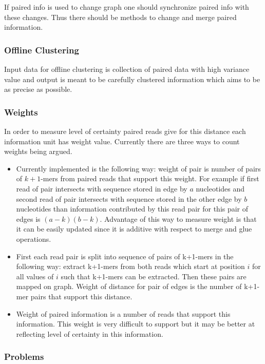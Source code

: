 \documentclass[12pt]{article}
\begin{document}
If paired info is used to change graph one should synchronize paired info with these changes. Thus there should be methods to change and merge paired information.

\subsubsection{Offline Clustering}

Input data for offline clustering is collection of paired data with high variance value and output is meant to be carefully clustered information which aims to be as precise as possible.

\subsubsection{Weights}
In order to measure level of certainty paired reads give for this distance each information unit has weight value. Currently there are three ways to count weights being argued.

\begin{itemize}
\item Currently implemented is the following way: weight of pair is number of pairs of $k+1$-mers from paired reads that support this weight. For example if first read of pair intersects with sequence stored in edge by $a$ nucleotides and second read of pair intersects with sequence stored in the other edge by $b$ nucleotides than information contributed by this read pair for this pair of edges is $(a - k)(b - k)$. Advantage of this way to measure weight is that it can be easily updated since it is additive with respect to merge and glue operations.
\item First each read pair is split into sequence of pairs of k+1-mers in the following way: extract k+1-mers from both reads which start at position $i$ for all values of $i$ such that k+1-mers can be extracted. Then these pairs are mapped on graph. Weight of distance for pair of edges is the number of k+1-mer pairs that support this distance.
\item Weight of paired information is a number of reads that support this information. This weight is very difficult to support but it may be better at reflecting level of certainty in this information.
\end{itemize}

\subsubsection{Problems}
\end{document}

